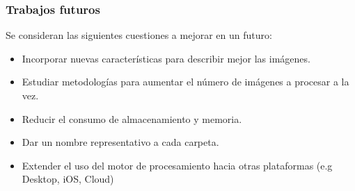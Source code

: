 %
%	
%
\begin{frame}[t,fragile]
\frametitle {Trabajos futuros}
Se consideran las siguientes cuestiones a mejorar en un futuro:

\begin{itemize}
	\item Incorporar nuevas características para describir mejor las imágenes.
	\vspace{4mm}
	\item Estudiar metodologías para aumentar el número de imágenes a procesar a la vez.
	\vspace{4mm}
	\item Reducir el consumo de almacenamiento y memoria.
	\vspace{4mm}
	\item Dar un nombre representativo a cada carpeta.
	\vspace{4mm}
	
	
	\item Extender el uso del motor de procesamiento hacia otras plataformas (e.g Desktop, iOS, Cloud)
\end{itemize}
\end{frame}

